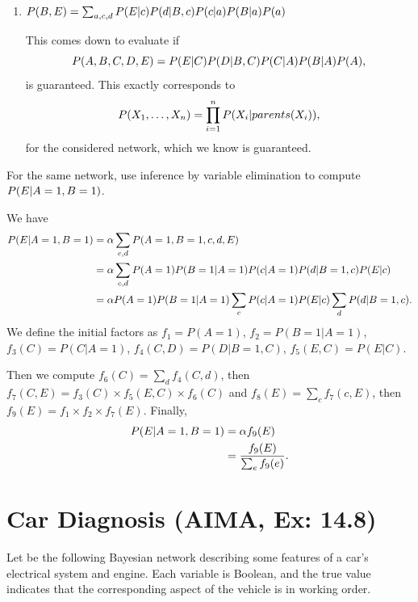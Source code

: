 \documentclass[11pt, a4paper]{article}
\begin{document}
\begin{enumerate}
    \item $P(B, E) = \sum_{a, c, d} P(E \vert c) P(d \vert B, c) P(c \vert a) P(B \vert a) P(a)$
    
    \begin{solution}
        This comes down to evaluate if $$P(A, B, C, D, E) = P(E \vert C) P(D \vert B, C) P(C \vert A) P(B \vert A) P(A),$$
        is guaranteed. This exactly corresponds to
        \begin{equation*}
            P(X_1, \dots, X_n) = \prod_{i = 1}^n P(X_i \vert parents(X_i)) ,
        \end{equation*}
        for the considered network, which we know is guaranteed.
    \end{solution}
\end{enumerate}

For the same network, use inference by variable elimination to compute $P(E \vert A = 1, B = 1)$.

\begin{solution}
    We have
    \begin{align*}
        P(E \vert A = 1, B = 1) & = \alpha \sum_{c, d} P(A = 1, B = 1, c, d, E)\\
        & = \alpha \sum_{c, d} P(A = 1) P(B = 1| A = 1) P(c| A = 1) P(d|B = 1, c) P(E|c) \\
        & = \alpha P(A = 1) P(B = 1 | A = 1) \sum_{c} P(c|A = 1) P(E|c)\sum_d P(d|B = 1,c) .
    \end{align*}
    We define the initial factors as $f_1 = P(A=1)$, $f_2 = P(B=1 | A=1)$, $f_3(C) = P(C|A=1)$, $f_4(C, D) = P(D|B=1, C)$, $f_5(E, C) = P(E|C)$.
    
    Then we compute $f_6(C) = \sum_d f_4(C, d)$, then $f_7(C, E) = f_3(C) \times f_5(E, C) \times f_6(C)$ and $f_8(E) = \sum_c f_7(c, E)$, then $f_9(E) = f_1 \times f_2 \times f_7(E)$. Finally,
    \begin{align*}
        P(E \vert A = 1, B = 1) & = \alpha f_9(E) \\
        & = \frac{f_9(E)}{\sum_e f_9(e)}.
    \end{align*}
\end{solution}

\newpage

\section{Car Diagnosis (AIMA, Ex: 14.8)}

Let be the following Bayesian network describing some features of a car's electrical system and engine. Each variable is Boolean, and the true value indicates that the corresponding aspect of the vehicle is in working order.
\end{document}
